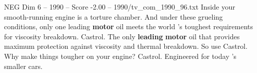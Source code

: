 \begin{textsample}{NEG Dim 6 – 1990 – Score -2.00 – 1990/tv\_com\_1990\_96.txt}  \label{ex:f6_neg_026}
Inside your smooth-running engine is a torture chamber.
And under these grueling conditions, only one leading \textbf{motor} oil meets the world 's toughest requirements for viscosity breakdown.
Castrol.
The only \textbf{leading} \textbf{motor} oil that provides maximum protection against viscosity and thermal breakdown.
So use Castrol.
Why make things tougher on your engine?
Castrol.
Engineered for today 's smaller cars.

\end{textsample}
